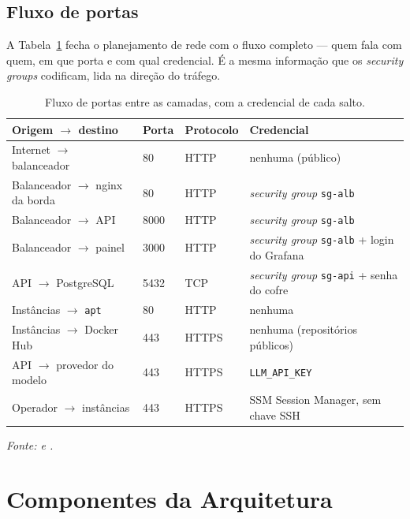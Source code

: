 \documentclass[11pt,a4paper]{article}
\begin{document}
\subsection{Fluxo de portas}

A Tabela~\ref{tab:portas} fecha o planejamento de rede com o fluxo completo --- quem fala com quem,
em que porta e com qual credencial. É a mesma informação que os \emph{security groups} codificam,
lida na direção do tráfego.

\begin{table}[tb]
\caption{Fluxo de portas entre as camadas, com a credencial de cada salto.}
\label{tab:portas}
\centering\small
\begin{tabularx}{\textwidth}{p{3.4cm}p{1.5cm}p{2.6cm}X}
\toprule
\textbf{Origem $\rightarrow$ destino} & \textbf{Porta} & \textbf{Protocolo} & \textbf{Credencial} \\
\midrule
Internet $\rightarrow$ balanceador & 80 & HTTP & nenhuma (público) \\
Balanceador $\rightarrow$ nginx da borda & 80 & HTTP & \emph{security group} \texttt{sg-alb} \\
Balanceador $\rightarrow$ API & 8000 & HTTP & \emph{security group} \texttt{sg-alb} \\
Balanceador $\rightarrow$ painel & 3000 & HTTP & \emph{security group} \texttt{sg-alb} + login do Grafana \\
API $\rightarrow$ PostgreSQL & 5432 & TCP & \emph{security group} \texttt{sg-api} + senha do cofre \\
Instâncias $\rightarrow$ \texttt{apt} & 80 & HTTP & nenhuma \\
Instâncias $\rightarrow$ Docker Hub & 443 & HTTPS & nenhuma (repositórios públicos) \\
API $\rightarrow$ provedor do modelo & 443 & HTTPS & \texttt{LLM\_API\_KEY} \\
Operador $\rightarrow$ instâncias & 443 & HTTPS & SSM Session Manager, sem chave SSH \\
\bottomrule
\end{tabularx}
{\small\itshape Fonte:  e .}
\end{table}

\section{Componentes da Arquitetura}
\end{document}
